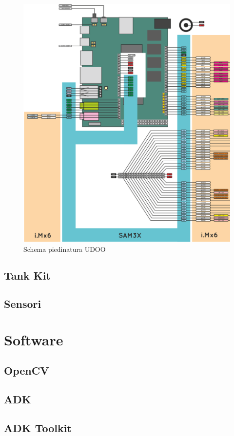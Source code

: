 \begin{figure}[ht] \center
\includegraphics[width=\textwidth]{immagini/udoo_pinout.png}
\caption{Schema piedinatura UDOO} 
\end{figure}
\subsection {Tank Kit}
\subsection {Sensori}

\section{Software}
\subsection {OpenCV}
\subsection {ADK}
\subsection {ADK Toolkit}
